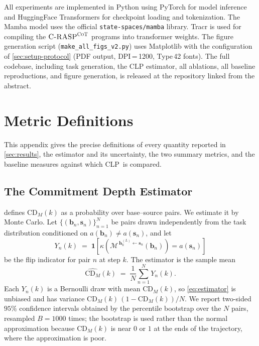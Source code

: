 \documentclass[11pt]{article}
\newcommand{\CDM}{\mathrm{CD}_{M}}
\newcommand{\stepk}{k}
\newcommand{\CLP}{\textsc{CLP}}
\newcommand{\CRASPCoT}{\textsc{C-RASP}^{\textsc{CoT}}}
\begin{document}
All experiments are implemented in Python using PyTorch for model inference and
HuggingFace Transformers for checkpoint loading and tokenization. The Mamba model
uses the official \texttt{state-spaces/mamba} library. Tracr is used for
compiling the $\CRASPCoT$ programs into transformer weights. The figure
generation script (\texttt{make\_all\_figs\_v2.py}) uses Matplotlib with the
configuration of \cref{sec:setup-protocol} (PDF output, DPI\,=\,1200, Type\,42
fonts). The full codebase, including task generation, the CLP estimator, all
ablations, all baseline reproductions, and figure generation, is released at the
repository linked from the abstract.

\section{Metric Definitions}
\label{app:metrics}

This appendix gives the precise definitions of every quantity reported in
\cref{sec:results}, the estimator and its uncertainty, the two summary metrics,
and the baseline measures against which \CLP\ is compared.

\subsection{The Commitment Depth Estimator}
\label{app:metrics-estimator}

 defines $\CDM(\stepk)$ as a probability over base--source pairs.
We estimate it by Monte Carlo. Let $\{(\mathbf{b}_{n},\mathbf{s}_{n})\}_{n=1}^{N}$
be pairs drawn independently from the task distribution conditioned on
$a(\mathbf{b}_{n})\neq a(\mathbf{s}_{n})$, and let
\begin{equation}
\label{eq:indicator}
Y_{n}(\stepk) \;=\; \mathbf{1}\!\left[\kappa\!\left(
\mathcal{M}^{\,\mathbf{h}^{(L)}_{\stepk}\leftarrow\mathbf{s}_{n}}(\mathbf{b}_{n})
\right)=a(\mathbf{s}_{n})\right]
\end{equation}
be the flip indicator for pair $n$ at step $\stepk$. The estimator is the sample
mean
\begin{equation}
\label{eq:estimator}
\widehat{\CDM}(\stepk) \;=\; \frac{1}{N}\sum_{n=1}^{N} Y_{n}(\stepk).
\end{equation}
Each $Y_{n}(\stepk)$ is a Bernoulli draw with mean $\CDM(\stepk)$, so
\cref{eq:estimator} is unbiased and has variance
$\CDM(\stepk)\,(1-\CDM(\stepk))/N$. We report two-sided $95\%$ confidence
intervals obtained by the percentile bootstrap over the $N$ pairs, resampled
$B=1000$ times; the bootstrap is used rather than the normal approximation
because $\CDM(\stepk)$ is near $0$ or $1$ at the ends of the trajectory, where
the approximation is poor.
\end{document}
